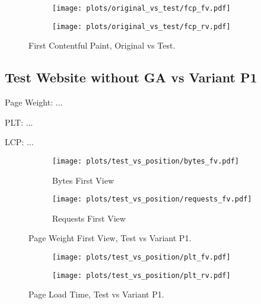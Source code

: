 \begin{figure}
	\centering
	\begin{subfigure}{.5\textwidth}
		\centering
		\texttt{[image: plots/original\_vs\_test/fcp\_fv.pdf]}
		\label{fig:sub1}
	\end{subfigure}%
	\begin{subfigure}{.5\textwidth}
		\centering
		\texttt{[image: plots/original\_vs\_test/fcp\_rv.pdf]}
		\label{fig:sub2}
	\end{subfigure}
	\caption{First Contentful Paint, Original vs Test.}
	\label{figure:fcp_original_test}
\end{figure}


\clearpage




\subsection{Test Website without GA vs Variant P1}


Page Weight: ...

PLT: ...

LCP: ...


\begin{figure}
	\centering
	\begin{subfigure}{.5\textwidth}
		\centering
		\texttt{[image: plots/test\_vs\_position/bytes\_fv.pdf]}
		\caption{Bytes First View}
		\label{fig:sub1}
	\end{subfigure}%
	\begin{subfigure}{.5\textwidth}
		\centering
		\texttt{[image: plots/test\_vs\_position/requests\_fv.pdf]}
		\caption{Requests First View}
		\label{fig:sub2}
	\end{subfigure}
	\caption{Page Weight First View, Test vs Variant P1.}
	\label{figure:plt_original_test}
\end{figure}


\begin{figure}
	\centering
	\begin{subfigure}{.5\textwidth}
		\centering
		\texttt{[image: plots/test\_vs\_position/plt\_fv.pdf]}
		\label{fig:sub1}
	\end{subfigure}%
	\begin{subfigure}{.5\textwidth}
		\centering
		\texttt{[image: plots/test\_vs\_position/plt\_rv.pdf]}
		\label{fig:sub2}
	\end{subfigure}
	\caption{Page Load Time, Test vs Variant P1.}
	\label{figure:plt_original_test}
\end{figure}


